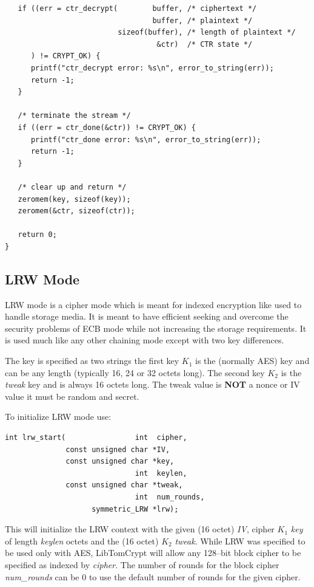 \documentclass[synpaper]{book}
\begin{document}
\begin{small}
\begin{verbatim}
   if ((err = ctr_decrypt(        buffer, /* ciphertext */
                                  buffer, /* plaintext */
                          sizeof(buffer), /* length of plaintext */
                                   &ctr)  /* CTR state */
      ) != CRYPT_OK) {
      printf("ctr_decrypt error: %s\n", error_to_string(err));
      return -1;
   }

   /* terminate the stream */
   if ((err = ctr_done(&ctr)) != CRYPT_OK) {
      printf("ctr_done error: %s\n", error_to_string(err));
      return -1;
   }

   /* clear up and return */
   zeromem(key, sizeof(key));
   zeromem(&ctr, sizeof(ctr));

   return 0;
}
\end{verbatim}
\end{small}

\subsection{LRW Mode}
LRW mode is a cipher mode which is meant for indexed encryption like used to handle storage media.  It is meant to have efficient seeking and overcome the
security problems of ECB mode while not increasing the storage requirements.  It is used much like any other chaining mode except with two key differences.

The key is specified as two strings the first key $K_1$ is the (normally AES) key and can be any length (typically 16, 24 or 32 octets long).  The second key
$K_2$ is the \textit{tweak} key and is always 16 octets long.  The tweak value is \textbf{NOT} a nonce or IV value it must be random and secret.

To initialize LRW mode use:

\begin{verbatim}
int lrw_start(                int  cipher,
              const unsigned char *IV,
              const unsigned char *key,
                              int  keylen,
              const unsigned char *tweak,
                              int  num_rounds,
                    symmetric_LRW *lrw);
\end{verbatim}

This will initialize the LRW context with the given (16 octet) \textit{IV}, cipher $K_1$ \textit{key} of length \textit{keylen} octets and the (16 octet) $K_2$ \textit{tweak}.
While LRW was specified to be used only with AES, LibTomCrypt will allow any 128--bit block cipher to be specified as indexed by \textit{cipher}.  The
number of rounds for the block cipher \textit{num\_rounds} can be 0 to use the default number of rounds for the given cipher.
\end{document}
